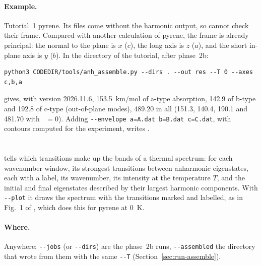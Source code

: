 \paragraph{Example.} Tutorial~1 pyrene. Its files come without the
harmonic output, so  cannot check their frame. Compared
with another calculation of pyrene, the frame is already principal: the
normal to the plane is $x$ ($c$), the long axis is $z$ ($a$), and the
short in-plane axis is $y$ ($b$). In the directory of the tutorial, after
phase~2b:
\begin{lstlisting}
python3 CODEDIR/tools/anh_assemble.py --dirs . --out res --T 0 --axes c,b,a
\end{lstlisting}
 gives, with version 2026.11.6, 153.5~km/mol of a-type
absorption, 142.9 of b-type and 192.8 of c-type (out-of-plane modes),
489.20 in all (151.3, 140.4, 190.1 and 481.70 with ~$=0$). Adding
\texttt{-{}-envelope a=A.dat b=B.dat c=C.dat}, with contours computed for
the experiment, writes .

\section{}\label{sec:run-assign}

 tells which transitions make up the bands of a
thermal spectrum: for each wavenumber window, its strongest transitions
between anharmonic eigenstates, each with a label, its wavenumber, its
intensity at the temperature $T$, and the initial and final eigenstates
described by their largest harmonic components. With \texttt{-{}-plot}
it draws the spectrum with the transitions marked and labelled, as in
Fig.~1 of \cite{debentzmann2026}, which does this for pyrene at 0~K.

\paragraph{Where.} Anywhere: \texttt{-{}-jobs} (or \texttt{-{}-dirs}) are
the phase~2b runs, \texttt{-{}-assembled} the directory that
 wrote from them with the same \texttt{-{}-T}
(Section~\ref{sec:run-assemble}).

